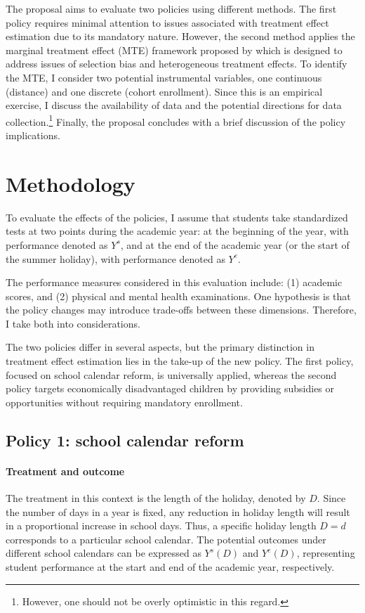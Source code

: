 \documentclass[12pt]{article}
\begin{document}
The proposal aims to evaluate two policies using different methods. The first
policy requires minimal attention to issues associated with treatment effect
estimation due to its mandatory nature. However, the second method applies the
marginal treatment effect (MTE) framework proposed by
\citet{bjorklund1987estimation, heckman2005structural} which is designed to
address issues of selection bias and heterogeneous treatment effects. To
identify the MTE, I consider two potential instrumental variables, one
continuous (distance) and one discrete (cohort enrollment). Since this is an
empirical exercise, I discuss the availability of data and the potential
directions for data collection.\footnote{However, one should not be overly
    optimistic in this regard.} Finally, the proposal concludes with a brief
discussion of the policy implications.

\section{Methodology}
To evaluate the effects of the policies, I assume that students take
standardized tests at two points during the academic year: at the beginning of
the year, with performance denoted as $Y^s$, and at the end of the academic
year (or the start of the summer holiday), with performance denoted as $Y^e$.

The performance measures considered in this evaluation include: (1) academic
scores, and (2) physical and mental health examinations. One hypothesis is that
the policy changes may introduce trade-offs between these dimensions.
Therefore, I take both into considerations.

The two policies differ in several aspects, but the primary distinction in
treatment effect estimation lies in the take-up of the new policy. The first
policy, focused on school calendar reform, is universally applied, whereas the
second policy targets economically disadvantaged children by providing
subsidies or opportunities without requiring mandatory enrollment.

\subsection{Policy 1: school calendar reform}

\paragraph{Treatment and outcome} The treatment in this context is the length of the holiday, denoted by $D$.
Since the number of days in a year is fixed, any reduction in holiday length
will result in a proportional increase in school days. Thus, a specific holiday
length $D = d$ corresponds to a particular school calendar. The potential
outcomes under different school calendars can be expressed as $Y^s(D)$ and
$Y^e(D)$, representing student performance at the start and end of the academic
year, respectively.
\end{document}
